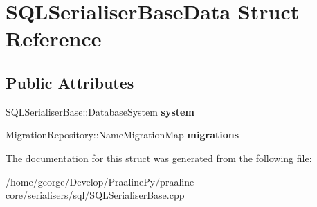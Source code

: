 \hypertarget{struct_s_q_l_serialiser_base_data}{}\section{S\+Q\+L\+Serialiser\+Base\+Data Struct Reference}
\label{struct_s_q_l_serialiser_base_data}
\subsection*{Public Attributes}
\begin{DoxyCompactItemize}
\item 
\mbox{\label{struct_s_q_l_serialiser_base_data_a7b6f0d23e70a7b92efedfa9af0d54507}} 
S\+Q\+L\+Serialiser\+Base\+::\+Database\+System {\bfseries system}
\item 
\mbox{\label{struct_s_q_l_serialiser_base_data_a1c9e9448129800cfc26097808f0c1685}} 
Migration\+Repository\+::\+Name\+Migration\+Map {\bfseries migrations}
\end{DoxyCompactItemize}


The documentation for this struct was generated from the following file\+:\begin{DoxyCompactItemize}
\item 
/home/george/\+Develop/\+Praaline\+Py/praaline-\/core/serialisers/sql/S\+Q\+L\+Serialiser\+Base.\+cpp\end{DoxyCompactItemize}
